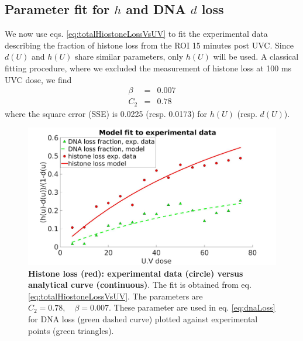 \documentclass[12pt]{article}
\newcommand{\beq}{\begin{eqnarray}}
\newcommand{\eeq}{\end{eqnarray}}
\begin{document}
\subsection{Parameter fit for $h$ and DNA $d$ loss}\label{subsection:parameterFit}
We now use eqs. \ref{eq:totalHiostoneLossVsUV} to fit the experimental data describing the fraction of histone loss from the ROI 15 minutes post UVC. Since $d(U)$ and $h(U)$ share similar parameters, only $h(U)$ will be used. A classical fitting procedure, where we excluded the measurement of histone loss at 100 ms UVC dose, we find
\beq
\beta &=&  0.007\\
C_2 &=&  0.78
\eeq
where the square error (SSE) is 0.0225 (resp. 0.0173) for $h(U)$ (resp. $d(U)$).
\begin{figure}[http!]
\centering
\includegraphics[width=0.5\linewidth, height=0.3\textheight]{histoneAndDnaVsUvDoseModelFit}
\caption{\textbf{Histone loss (red): experimental data (circle) versus analytical curve (continuous)}. The fit is obtained from  eq. \ref{eq:totalHiostoneLossVsUV}.  The parameters are $C_2 =0.78,\quad \beta=0.007$. These parameter are used in eq. \ref{eq:dnaLoss} for DNA loss (green dashed curve) plotted against experimental points (green triangles).}
\label{fig:histoneAndDnaVsUvDoseModelFit}
\end{figure}

\end{document}
